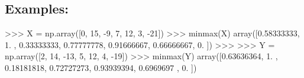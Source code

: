 \documentclass[]{article}
\newenvironment{Shaded}{\begin{snugshade}}{\end{snugshade}}
\newcommand{\DecValTok}[1]{\textcolor[rgb]{0.96,0.45,0.00}{#1}}
\newcommand{\FloatTok}[1]{\textcolor[rgb]{0.96,0.45,0.00}{#1}}
\newcommand{\NormalTok}[1]{\textcolor[rgb]{0.81,0.81,0.76}{#1}}
\newcommand{\OperatorTok}[1]{\textcolor[rgb]{0.81,0.81,0.76}{#1}}
\begin{document}
\hypertarget{examples-8}{%
\subsection{Examples:}\label{examples-8}}

\begin{Shaded}
\begin{Highlighting}[]
\OperatorTok{>>>}\NormalTok{ X }\OperatorTok{=}\NormalTok{ np.array([}\DecValTok{0}\NormalTok{, }\DecValTok{15}\NormalTok{, }\DecValTok{-9}\NormalTok{, }\DecValTok{7}\NormalTok{, }\DecValTok{12}\NormalTok{, }\DecValTok{3}\NormalTok{, }\DecValTok{-21}\NormalTok{])}
\OperatorTok{>>>}\NormalTok{ minmax(X)}
\NormalTok{array([}\FloatTok{0.58333333}\NormalTok{, }\FloatTok{1.}\NormalTok{        , }\FloatTok{0.33333333}\NormalTok{, }\FloatTok{0.77777778}\NormalTok{, }\FloatTok{0.91666667}\NormalTok{,}
       \FloatTok{0.66666667}\NormalTok{, }\FloatTok{0.}\NormalTok{        ])}
\OperatorTok{>>>}
\OperatorTok{>>>}\NormalTok{ Y }\OperatorTok{=}\NormalTok{ np.array([}\DecValTok{2}\NormalTok{, }\DecValTok{14}\NormalTok{, }\DecValTok{-13}\NormalTok{, }\DecValTok{5}\NormalTok{, }\DecValTok{12}\NormalTok{, }\DecValTok{4}\NormalTok{, }\DecValTok{-19}\NormalTok{])}
\OperatorTok{>>>}\NormalTok{ minmax(Y)}
\NormalTok{array([}\FloatTok{0.63636364}\NormalTok{, }\FloatTok{1.}\NormalTok{        , }\FloatTok{0.18181818}\NormalTok{, }\FloatTok{0.72727273}\NormalTok{, }\FloatTok{0.93939394}\NormalTok{,}
       \FloatTok{0.6969697}\NormalTok{ , }\FloatTok{0.}\NormalTok{        ])}
\end{Highlighting}
\end{Shaded}

\clearpage
\end{document}
